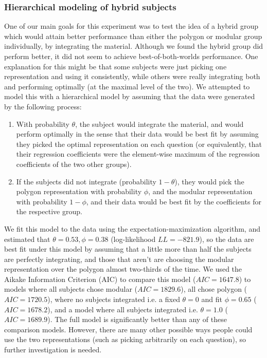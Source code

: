 \documentclass[11pt]{article}
\begin{document}
\subsubsection{Hierarchical modeling of hybrid subjects}
One of our main goals for this experiment was to test the idea of a hybrid group which would attain better performance than either the polygon or modular group individually, by integrating the material. Although we found the hybrid group did perform better, it did not seem to achieve best-of-both-worlds performance. One explanation for this might be that some subjects were just picking one representation and using it consistently, while others were really integrating both and performing optimally (at the maximal level of the two). We attempted to model this with a hierarchical model by assuming that the data were generated by the following process: 
\begin{enumerate}
\item With probability $\theta$, the subject would integrate the material, and would perform optimally in the sense that their data would be best fit by assuming they picked the optimal representation on each question (or equivalently, that their regression coefficients were the element-wise maximum of the regression coefficients of the two other groups). 
\item If the subjects did not integrate (probability $1-\theta$), they would pick the polygon representation with probability $\phi$, and the modular representation with probability $1-\phi$, and their data would be best fit by the coefficients for the respective group.
\end{enumerate}
We fit this model to the data using the expectation-maximization algorithm, and estimated that $\theta = 0.53, \phi = 0.38$ (log-likelihood $LL=-821.9$), so the data are best fit under this model by assuming that a little more than half the subjects are perfectly integrating, and those that aren't are choosing the modular representation over the polygon almost two-thirds of the time. We used the Aikake Information Criterion (AIC) to compare this model ($AIC = 1647.8$) to models where all subjects chose modular ($AIC=1829.6$), all chose polygon ($AIC = 1720.5$), where no subjects integrated i.e. a fixed $\theta = 0$ and fit $\phi = 0.65$ ($AIC = 1678.2$), and a model where all subjects integrated i.e. $\theta = 1.0$ ($AIC = 1689.9$). The full model is significantly better than any of these comparison models. However, there are many other possible ways people could use the two representations (such as picking arbitrarily on each question), so further investigation is needed.
\end{document}
